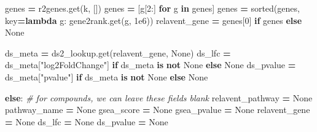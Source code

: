 \documentclass[
]{book}
\newenvironment{Shaded}{\begin{snugshade}}{\end{snugshade}}
\newcommand{\BuiltInTok}[1]{#1}
\newcommand{\CommentTok}[1]{\textcolor[rgb]{0.56,0.35,0.01}{\textit{#1}}}
\newcommand{\ControlFlowTok}[1]{\textcolor[rgb]{0.13,0.29,0.53}{\textbf{#1}}}
\newcommand{\DecValTok}[1]{\textcolor[rgb]{0.00,0.00,0.81}{#1}}
\newcommand{\FloatTok}[1]{\textcolor[rgb]{0.00,0.00,0.81}{#1}}
\newcommand{\KeywordTok}[1]{\textcolor[rgb]{0.13,0.29,0.53}{\textbf{#1}}}
\newcommand{\NormalTok}[1]{#1}
\newcommand{\OperatorTok}[1]{\textcolor[rgb]{0.81,0.36,0.00}{\textbf{#1}}}
\newcommand{\StringTok}[1]{\textcolor[rgb]{0.31,0.60,0.02}{#1}}
\newcommand{\VariableTok}[1]{\textcolor[rgb]{0.00,0.00,0.00}{#1}}
\begin{document}
\begin{Shaded}
\begin{Highlighting}[numbers=left,,]
\NormalTok{            genes }\OperatorTok{=}\NormalTok{ r2genes.get(k, [])}
\NormalTok{            genes }\OperatorTok{=}\NormalTok{ [g[}\DecValTok{2}\NormalTok{:] }\ControlFlowTok{for}\NormalTok{ g }\KeywordTok{in}\NormalTok{ genes]}
\NormalTok{            genes }\OperatorTok{=} \BuiltInTok{sorted}\NormalTok{(genes, key}\OperatorTok{=}\KeywordTok{lambda}\NormalTok{ g: gene2rank.get(g, }\FloatTok{1e6}\NormalTok{))}
\NormalTok{            relavent\_gene }\OperatorTok{=}\NormalTok{ genes[}\DecValTok{0}\NormalTok{] }\ControlFlowTok{if}\NormalTok{ genes }\ControlFlowTok{else} \VariableTok{None}
            
\NormalTok{            ds\_meta }\OperatorTok{=}\NormalTok{ ds2\_lookup.get(relavent\_gene, }\VariableTok{None}\NormalTok{)}
\NormalTok{            ds\_lfc }\OperatorTok{=}\NormalTok{ ds\_meta[}\StringTok{"log2FoldChange"}\NormalTok{] }\ControlFlowTok{if}\NormalTok{ ds\_meta }\KeywordTok{is} \KeywordTok{not} \VariableTok{None} \ControlFlowTok{else} \VariableTok{None}
\NormalTok{            ds\_pvalue }\OperatorTok{=}\NormalTok{ ds\_meta[}\StringTok{"pvalue"}\NormalTok{] }\ControlFlowTok{if}\NormalTok{ ds\_meta }\KeywordTok{is} \KeywordTok{not} \VariableTok{None} \ControlFlowTok{else} \VariableTok{None}
        
        \ControlFlowTok{else}\NormalTok{: }\CommentTok{\# for compounds, we can leave these fields blank}
\NormalTok{            relavent\_pathway }\OperatorTok{=} \VariableTok{None}
\NormalTok{            pathway\_name }\OperatorTok{=} \VariableTok{None}
\NormalTok{            gsea\_score }\OperatorTok{=} \VariableTok{None}
\NormalTok{            gsea\_pvalue }\OperatorTok{=} \VariableTok{None}
\NormalTok{            relavent\_gene }\OperatorTok{=} \VariableTok{None}
\NormalTok{            ds\_lfc }\OperatorTok{=} \VariableTok{None}
\NormalTok{            ds\_pvalue }\OperatorTok{=} \VariableTok{None}


\end{Highlighting}
\end{Shaded}
\end{document}
